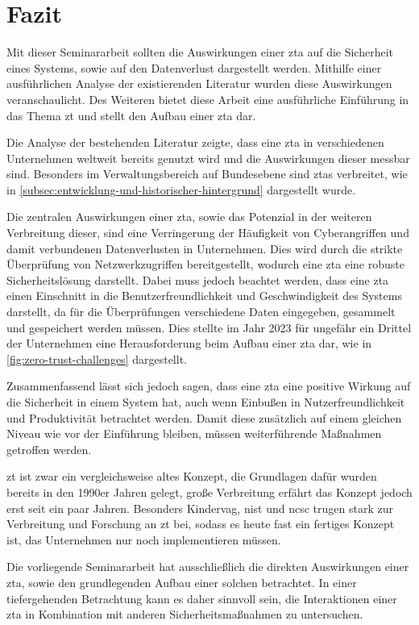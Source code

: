 \newpage
\section{Fazit}\label{sec:fazit}

Mit dieser Seminararbeit sollten die Auswirkungen einer \ac{zta} auf die Sicherheit eines Systems, sowie auf den Datenverlust dargestellt werden.
Mithilfe einer ausführlichen Analyse der existierenden Literatur wurden diese Auswirkungen veranschaulicht.
Des Weiteren bietet diese Arbeit eine ausführliche Einführung in das Thema \ac{zt} und stellt den Aufbau einer \ac{zta} dar.

Die Analyse der bestehenden Literatur zeigte, dass eine \ac{zta} in verschiedenen Unternehmen weltweit bereits genutzt wird und die Auswirkungen dieser messbar sind.
Besonders im Verwaltungsbereich auf Bundesebene sind \acp{zta} verbreitet, wie in \autoref{subsec:entwicklung-und-historischer-hintergrund} dargestellt wurde.

Die zentralen Auswirkungen einer \ac{zta}, sowie das Potenzial in der weiteren Verbreitung dieser, sind eine Verringerung der Häufigkeit von Cyberangriffen und damit verbundenen Datenverlusten in Unternehmen.
Dies wird durch die strikte Überprüfung von Netzwerkzugriffen bereitgestellt, wodurch eine \ac{zta} eine robuste Sicherheitslösung darstellt.
Dabei muss jedoch beachtet werden, dass eine \ac{zta} einen Einschnitt in die Benutzerfreundlichkeit und Geschwindigkeit des Systems darstellt, da für die Überprüfungen verschiedene Daten eingegeben, gesammelt und gespeichert werden müssen.
Dies stellte im Jahr 2023 für ungefähr ein Drittel der Unternehmen eine Herausforderung beim Aufbau einer \ac{zta} dar, wie in \autoref{fig:zero-trust-challenges} dargestellt.

Zusammenfassend lässt sich jedoch sagen, dass eine \ac{zta} eine positive Wirkung auf die Sicherheit in einem System hat, auch wenn Einbußen in Nutzerfreundlichkeit und Produktivität betrachtet werden.
Damit diese zusätzlich auf einem gleichen Niveau wie vor der Einführung bleiben, müssen weiterführende Maßnahmen getroffen werden.

\ac{zt} ist zwar ein vergleichsweise altes Konzept, die Grundlagen dafür wurden bereits in den 1990er Jahren gelegt, große Verbreitung erfährt das Konzept jedoch erst seit ein paar Jahren.
Besonders Kindervag, \ac{nist} und \ac{ncsc} trugen stark zur Verbreitung und Forschung an \ac{zt} bei, sodass es heute fast ein fertiges Konzept ist, das Unternehmen nur noch implementieren müssen.\autocites{kindervag-2010}{NIST:800207}{ncsc-2021}

Die vorliegende Seminararbeit hat ausschließlich die direkten Auswirkungen einer \ac{zta}, sowie den grundlegenden Aufbau einer solchen betrachtet.
In einer tiefergehenden Betrachtung kann es daher sinnvoll sein, die Interaktionen einer \ac{zta} in Kombination mit anderen Sicherheitsmaßnahmen zu untersuchen.